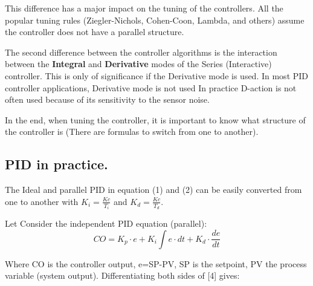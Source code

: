 This difference has a major impact on the tuning of the controllers. All the popular tuning rules (Ziegler-Nichols, Cohen-Coon, Lambda, and others) assume the controller does not have a parallel structure. 


The second difference between the controller algorithms is the interaction between the \textbf{Integral} and \textbf{Derivative} modes of the Series (Interactive) controller. This is only of significance if the Derivative mode is used. In most PID controller applications, Derivative mode is not used  In practice D-action is not often used because of its sensitivity to the sensor noise. 


In the end, when tuning the controller, it is important to know what structure of the controller is (There are formulas to switch from one to another).

\subsection{PID in practice.}

The Ideal and parallel PID in equation (1) and (2) can be easily converted from one to another with  $K_i = \frac{Kc}{T_i}$ and $K_d = \frac{Kc}{T_d}$.

Let Consider the independent PID equation (parallel):
\begin{equation}
	\label{eqn:4}
	CO = K_p\cdot e + K_i\int e\cdot dt +K_d\cdot\frac{de}{dt}
\end{equation}

Where CO is the controller output, e=SP-PV, SP is the setpoint, PV the process variable (system output). Differentiating both sides of [4] gives:

